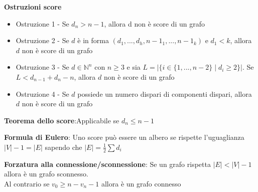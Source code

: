 \documentclass[11pt, letterpaper]{article}
\begin{document}
\textbf{Ostruzioni score}
\begin{itemize}
    \item Ostruzione 1 - Se $d_{n} > n-1$, allora d non è score di un grafo
    \item Ostruzione 2 - Se $d$ è in forma $(d_{1},...,d_{h},n-1_{1},...,n-1_{k})$ e $d_{1}<k$, allora 
    $d$ non è score di un grafo
    \item Ostruzione 3 - Se $d\in\mathbb{N}^{n}$ con $n\geq 3$ e sia $L=|\{i\in\{1,...,n-2\}\mid
    d_{i}\geq 2\}|$. Se $L<d_{n-1}+d_{n}-n$, allora $d$ non è score di un grafo
    \item Ostruzione 4 - Se $d$ possiede un numero dispari di componenti dispari, allora $d$ non è score
    di un grafo
\end{itemize}
\textbf{Teorema dello score}:Applicabile se $d_{n}\leq n-1$

\textbf{Formula di Eulero}: Uno score può essere un albero se rispette l'uguaglianza $|V|-1=|E|$ sapendo
che $|E|=\frac{1}{2}\sum d_{i}$

\textbf{Forzatura alla connessione/sconnessione}: Se un grafo rispetta $|E|<|V|-1$ allora è un grafo 
sconnesso.\\Al contrario se $v_{0}\geq n - v_{n} -1$ allora è un grafo connesso
\end{document}
